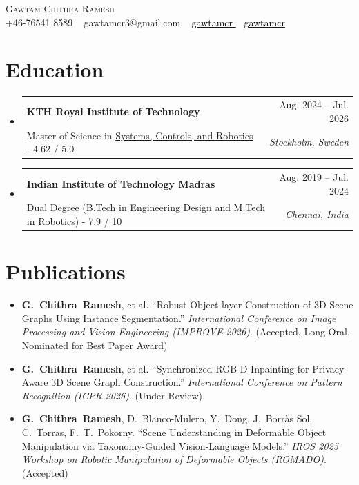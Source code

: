 \documentclass[letterpaper, 11pt]{article}
\makeatletter
\newcommand{\resumeSubheading}[4]{
\vspace{-1pt}
\item
\begin{tabular*}{1.0\textwidth}[t]{l@{\extracolsep{\fill}}r}
	\textbf{#1}       & {\small #2} \\
	{\small#3} & \textit{\small #4} \\
\end{tabular*}
\vspace{-10pt}
}
\newcommand{\resumeSubHeadingListStart}{\begin{itemize}[leftmargin=0.0in, label={}]}
\newcommand{\resumeSubHeadingListEnd}{\end{itemize}}
\makeatother
\begin{document}
	
\begin{center}
    {\Huge \scshape Gawtam Chithra Ramesh} \\
    \vspace{3pt}
    \vspace{1pt}
    \small 
    {
    \raisebox{-0.1\height}{\faPhone} +46-76541 8589 ~
    \href{gawtamcr3@gmail.com}{\raisebox{-0.2\height}{\faEnvelope}} {gawtamcr3@gmail.com} ~
    \href{https://linkedin.com/in/gawtamcr/}{\raisebox{-0.2\height}{\faLinkedin} \textcolor{black}{gawtamcr} } ~
    \href{https://gawtamcr.github.io/}{\raisebox{-0.2\height}{\faGithub} \textcolor{black}{gawtamcr}}
    }
    \vspace{-8pt}
\end{center}

\section{Education}
    \resumeSubHeadingListStart 
    \resumeSubheading {KTH Royal Institute of Technology}{Aug. 2024 -- Jul. 2026}{Master of Science in \href{https://www.kth.se/en/studies/master/systems-control-robotics/msc-systems-control-and-robotics-1.8733}{Systems, Controls, and Robotics} - 4.62 / 5.0}{Stockholm, Sweden}
    
    \resumeSubheading {Indian Institute of Technology Madras}{Aug. 2019 -- Jul. 2024}{Dual Degree (B.Tech in \href{https://ed.iitm.ac.in/about.html}{Engineering Design} and M.Tech in \href{https://ed.iitm.ac.in/~robotics_lab/}{Robotics}) - 7.9 / 10}{Chennai, India}

    \resumeSubHeadingListEnd

\section{Publications}
\begin{itemize}[leftmargin=0.15in]
    \setlength{\itemsep}{2pt}
    \item \textbf{G.~Chithra~Ramesh}, et al. ``Robust Object-layer Construction of 3D Scene Graphs Using Instance Segmentation.'' \textit{International Conference on Image Processing and Vision Engineering (IMPROVE 2026)}. (Accepted, Long Oral, Nominated for Best Paper Award)
    \item \textbf{G.~Chithra~Ramesh}, et al. ``Synchronized RGB-D Inpainting for Privacy-Aware 3D Scene Graph Construction.'' \textit{International Conference on Pattern Recognition (ICPR 2026)}. (Under Review)
    \item \textbf{G.~Chithra~Ramesh}, D.~Blanco-Mulero, Y.~Dong, J.~Borr\`as Sol, C.~Torras, F.~T.~Pokorny. ``Scene Understanding in Deformable Object Manipulation via Taxonomy-Guided Vision-Language Models.'' \textit{IROS 2025 Workshop on Robotic Manipulation of Deformable Objects (ROMADO)}. (Accepted)
\end{itemize}
\end{document}
